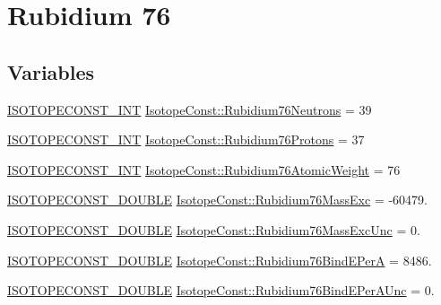 \hypertarget{group___isotope_const-_rubidium-_rb76}{}\section{Rubidium 76}
\label{group___isotope_const-_rubidium-_rb76}
\subsection*{Variables}
\begin{DoxyCompactItemize}
\item 
\mbox{\hyperlink{group___isotope_const-_macros_ga5f18360b3e99483a35c32d789e62621c}{I\+S\+O\+T\+O\+P\+E\+C\+O\+N\+S\+T\+\_\+\+I\+NT}} \mbox{\hyperlink{group___isotope_const-_rubidium-_rb76_ga710581618c964af5ab137798797d198a}{Isotope\+Const\+::\+Rubidium76\+Neutrons}} = 39
\item 
\mbox{\hyperlink{group___isotope_const-_macros_ga5f18360b3e99483a35c32d789e62621c}{I\+S\+O\+T\+O\+P\+E\+C\+O\+N\+S\+T\+\_\+\+I\+NT}} \mbox{\hyperlink{group___isotope_const-_rubidium-_rb76_gaea90e5dec59419e5e6cb39daf8ffac85}{Isotope\+Const\+::\+Rubidium76\+Protons}} = 37
\item 
\mbox{\hyperlink{group___isotope_const-_macros_ga5f18360b3e99483a35c32d789e62621c}{I\+S\+O\+T\+O\+P\+E\+C\+O\+N\+S\+T\+\_\+\+I\+NT}} \mbox{\hyperlink{group___isotope_const-_rubidium-_rb76_ga3cb3ec8cf9b4134438c07ad05f58eac2}{Isotope\+Const\+::\+Rubidium76\+Atomic\+Weight}} = 76
\item 
\mbox{\hyperlink{group___isotope_const-_macros_ga8f45a7272ce02c0b4c65c44636ed719a}{I\+S\+O\+T\+O\+P\+E\+C\+O\+N\+S\+T\+\_\+\+D\+O\+U\+B\+LE}} \mbox{\hyperlink{group___isotope_const-_rubidium-_rb76_gad1c731c354d7d6945664c25d9cbd10f5}{Isotope\+Const\+::\+Rubidium76\+Mass\+Exc}} = -\/60479.
\item 
\mbox{\hyperlink{group___isotope_const-_macros_ga8f45a7272ce02c0b4c65c44636ed719a}{I\+S\+O\+T\+O\+P\+E\+C\+O\+N\+S\+T\+\_\+\+D\+O\+U\+B\+LE}} \mbox{\hyperlink{group___isotope_const-_rubidium-_rb76_gaf885cc83d4a242a77a4f14cd0bf5e4de}{Isotope\+Const\+::\+Rubidium76\+Mass\+Exc\+Unc}} = 0.
\item 
\mbox{\hyperlink{group___isotope_const-_macros_ga8f45a7272ce02c0b4c65c44636ed719a}{I\+S\+O\+T\+O\+P\+E\+C\+O\+N\+S\+T\+\_\+\+D\+O\+U\+B\+LE}} \mbox{\hyperlink{group___isotope_const-_rubidium-_rb76_gaec75d5ab19acc06f5d52d8fabc46e254}{Isotope\+Const\+::\+Rubidium76\+Bind\+E\+PerA}} = 8486.
\item 
\mbox{\hyperlink{group___isotope_const-_macros_ga8f45a7272ce02c0b4c65c44636ed719a}{I\+S\+O\+T\+O\+P\+E\+C\+O\+N\+S\+T\+\_\+\+D\+O\+U\+B\+LE}} \mbox{\hyperlink{group___isotope_const-_rubidium-_rb76_ga29da7a2ecb5ab94afb862c8019c5cdd4}{Isotope\+Const\+::\+Rubidium76\+Bind\+E\+Per\+A\+Unc}} = 0.

\end{DoxyCompactItemize}
